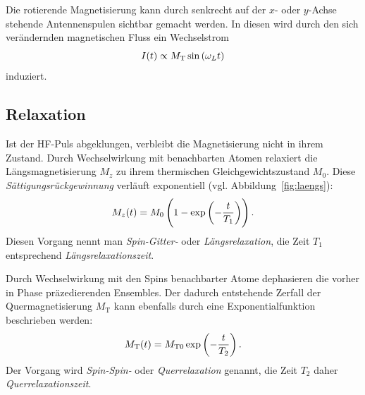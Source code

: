 \documentclass[
    11pt,
    ngerman
]{scrbook}
\begin{document}
Die rotierende Magnetisierung kann durch senkrecht auf der $x$- oder $y$-Achse
stehende Antennenspulen sichtbar gemacht werden. In diesen wird durch den sich
verändernden magnetischen Fluss ein Wechselstrom
\[
    I(t) \propto M_\text{T} \sin\left({\omega_L t}\right)
\]
induziert.





\subsection{Relaxation}

Ist der HF-Puls abgeklungen, verbleibt die Magnetisierung nicht in ihrem
Zustand. Durch Wechselwirkung mit benachbarten Atomen relaxiert die
Längsmagnetisierung $M_z$ zu ihrem thermischen Gleichgewichtszustand $M_0$.
Diese \emph{Sättigungsrückgewinnung} verläuft exponentiell (vgl. Abbildung~\ref{fig:laengs}):
\[
    M_z(t) = M_0\del{1-\dexp{-\frac{t}{T_1}}}.
\]
Diesen Vorgang nennt man \emph{Spin-Gitter-} oder \emph{Längsrelaxation}, die
Zeit $T_1$ entsprechend \emph{Längsrelaxationszeit}.

Durch Wechselwirkung mit den Spins benachbarter Atome dephasieren die vorher in
Phase präzedierenden Ensembles. Der dadurch entstehende Zerfall der
Quermagnetisierung $M_\text{T}$ kann ebenfalls durch eine Exponentialfunktion
beschrieben werden:
\[
    M_\text{T}(t) = M_{\text{T}0}\exp\left({-\frac{t}{T_2}}\right).
\]
Der Vorgang wird \emph{Spin-Spin-} oder \emph{Querrelaxation} genannt, die Zeit $T_2$ daher \emph{Querrelaxationszeit}. 
\end{document}
